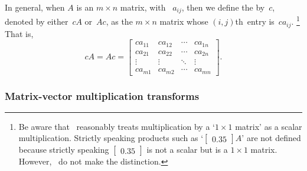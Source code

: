 In general, when \(A\) is an \(m\times n\) matrix, with ~\(a_{ij}\), then we define the  by~\(c\), denoted by either~\(cA\) or~\(Ac\), as the \(m\times n\) matrix whose \((i,j)\)th~entry is~\(ca_{ij}\).%
\footnote{Be aware that \script\ reasonably treats multiplication by a `\(1\times 1\) matrix' as a scalar multiplication.  
Strictly speaking products such as `\(\begin{bmatrix} 0.35 \end{bmatrix}A\)' are not defined because strictly speaking \(\begin{bmatrix} 0.35 \end{bmatrix}\) is not a scalar but is a \(1\times 1\) matrix.
However, \script\ do not make the distinction.}
That is,
\begin{equation*}
cA=Ac=\begin{bmatrix} ca_{11}&ca_{12}&\cdots&ca_{1n}
\\ca_{21}&ca_{22}&\cdots&ca_{2n}
\\\vdots&\vdots&\ddots&\vdots
\\ca_{m1}&ca_{m2}&\cdots&ca_{mn} \end{bmatrix}.
\end{equation*}




\subsubsection{Matrix-vector multiplication transforms}

